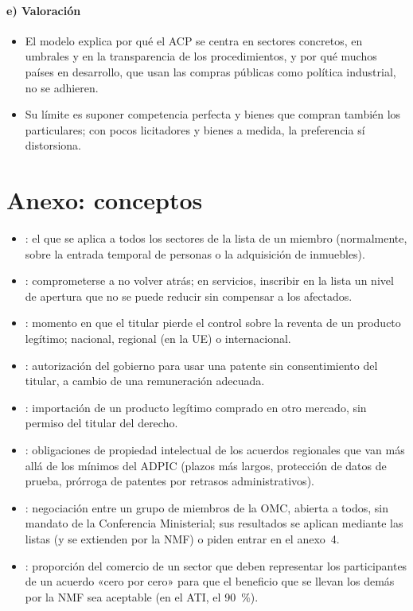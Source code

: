 \documentclass[11pt]{article}
\begin{document}
\paragraph{e) Valoración}

\begin{itemize}
\item El modelo explica por qué el ACP se centra en sectores concretos, en umbrales y en la transparencia de los procedimientos, y por qué muchos países en desarrollo, que usan las compras públicas como política industrial, no se adhieren.
\item Su límite es suponer competencia perfecta y bienes que compran también los particulares; con pocos licitadores y bienes a medida, la preferencia sí distorsiona.
\end{itemize}

\section{Anexo: conceptos}\label{anexo:conceptos}

\begin{itemize}
\item {}: el que se aplica a todos los sectores de la lista de un miembro (normalmente, sobre la entrada temporal de personas o la adquisición de inmuebles).
\item {}: comprometerse a no volver atrás; en servicios, inscribir en la lista un nivel de apertura que no se puede reducir sin compensar a los afectados.
\item {}: momento en que el titular pierde el control sobre la reventa de un producto legítimo; nacional, regional (en la UE) o internacional.
\item {}: autorización del gobierno para usar una patente sin consentimiento del titular, a cambio de una remuneración adecuada.
\item {}: importación de un producto legítimo comprado en otro mercado, sin permiso del titular del derecho.
\item {}: obligaciones de propiedad intelectual de los acuerdos regionales que van más allá de los mínimos del ADPIC (plazos más largos, protección de datos de prueba, prórroga de patentes por retrasos administrativos).
\item {}: negociación entre un grupo de miembros de la OMC, abierta a todos, sin mandato de la Conferencia Ministerial; sus resultados se aplican mediante las listas (y se extienden por la NMF) o piden entrar en el anexo~4.
\item {}: proporción del comercio de un sector que deben representar los participantes de un acuerdo «cero por cero» para que el beneficio que se llevan los demás por la NMF sea aceptable (en el ATI, el 90~\%).
\end{itemize}
\end{document}
